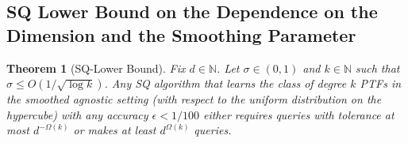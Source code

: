\documentclass[10pt,a4paper]{article}
\newtheorem{theorem}{Theorem}[section]
\newcommand{\1}{\Ind}
\begin{document}
\subsection{SQ Lower Bound on the Dependence on the Dimension and the Smoothing Parameter}


\begin{theorem}[SQ-Lower Bound]\label{thm:sq-noise-variance} 
Fix $d \in \mathbb N$. 
Let $\sigma \in (0, 1)$ and $k \in \mathbb N$ such that  $ \sigma\leq  O(1/\sqrt{\log k})$.
Any SQ algorithm that learns the class of degree $k$ PTFs
in the smoothed agnostic setting (with respect to the uniform distribution on the hypercube) with any accuracy $\epsilon < 1/100$
either requires queries with tolerance at
most $d^{-\Omega(k)}$ or makes at least $d^{\Omega(k)}$ queries.
\end{theorem}
\end{document}
